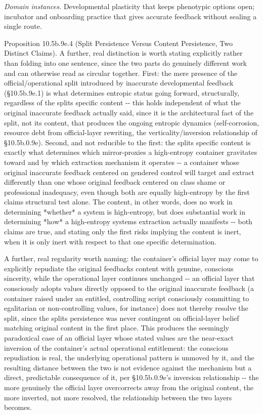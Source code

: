 \documentclass[
]{article}
\begin{document}
\emph{Domain instances.} Developmental plasticity that keeps phenotypic
options open; incubator and onboarding practice that gives accurate
feedback without sealing a single route.

Proposition 10.5b.9e.4 (Split Persistence Versus Content Persistence,
Two Distinct Claims). A further, real distinction is worth stating
explicitly rather than folding into one sentence, since the two parts do
genuinely different work and can otherwise read as circular together.
First: the mere presence of the official/operational split introduced by
inaccurate developmental feedback (§10.5b.9e.1) is what determines
entropic status going forward, structurally, regardless of the splits
specific content -\/- this holds independent of what the original
inaccurate feedback actually said, since it is the architectural fact of
the split, not its content, that produces the ongoing entropic dynamics
(self-corrosion, resource debt from official-layer rewriting, the
verticality/inversion relationship of §10.5b.0.9e). Second, and not
reducible to the first: the splits specific content is exactly what
determines which mirror-proxies a high-entropy container gravitates
toward and by which extraction mechanism it operates -\/- a container
whose original inaccurate feedback centered on gendered control will
target and extract differently than one whose original feedback centered
on class shame or professional inadequacy, even though both are equally
high-entropy by the first claims structural test alone. The content, in
other words, does no work in determining *whether* a system is
high-entropy, but does substantial work in determining *how* a
high-entropy systems extraction actually manifests -\/- both claims are
true, and stating only the first risks implying the content is inert,
when it is only inert with respect to that one specific determination.

A further, real regularity worth naming: the container's official layer
may come to explicitly repudiate the original feedbacks content with
genuine, conscious sincerity, while the operational layer continues
unchanged -\/- an official layer that consciously adopts values directly
opposed to the original inaccurate feedback (a container raised under an
entitled, controlling script consciously committing to egalitarian or
non-controlling values, for instance) does not thereby resolve the
split, since the splits persistence was never contingent on
official-layer belief matching original content in the first place. This
produces the seemingly paradoxical case of an official layer whose
stated values are the near-exact inversion of the container's actual
operational entitlement: the conscious repudiation is real, the
underlying operational pattern is unmoved by it, and the resulting
distance between the two is not evidence against the mechanism but a
direct, predictable consequence of it, per §10.5b.0.9e's inversion
relationship -\/- the more genuinely the official layer overcorrects
away from the original content, the more inverted, not more resolved,
the relationship between the two layers becomes.
\end{document}

